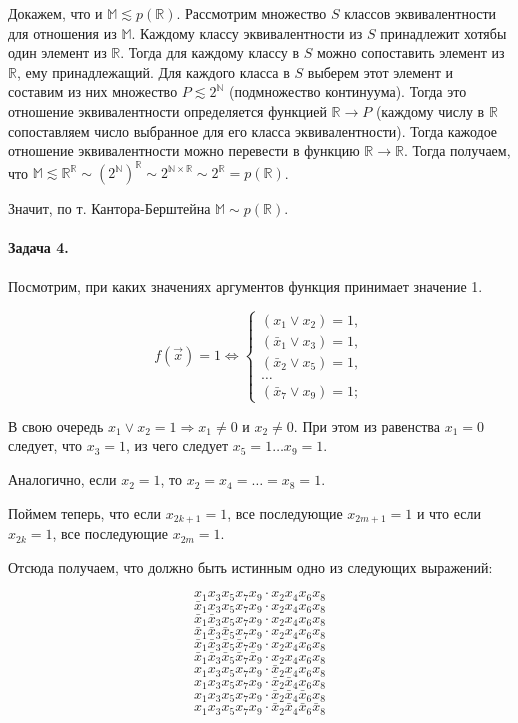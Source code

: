 \documentclass{article}
\newcommand{\andi}{$ и $}
\newcommand{\N}{\mathbb{N}}
\newcommand{\R}{\mathbb{R}}
\newcommand{\M}{\mathbb{M}}
\newcommand{\conti}{2^{\N}}
\begin{document}
     Докажем, что и $\M \apprle p(\R)$. Рассмотрим множество $S$ классов эквивалентности для отношения из $\M$. Каждому классу эквивалентности из $S$ принадлежит хотябы один элемент из $\R$. Тогда для каждому классу в $S$ можно сопоставить элемент из $\R$, ему принадлежащий. Для каждого класса в $S$ выберем этот элемент и составим из них множество $P \apprle \conti$ (подмножество континуума). Тогда это отношение эквивалентности определяется функцией $\R \rightarrow P$ (каждому числу в $\R$ сопоставляем число выбранное для его класса эквивалентности). Тогда кажодое отношение эквивалентности можно перевести в функцию $\R \rightarrow \R$. Тогда получаем, что $\M \apprle \R^{\R} \sim (\conti)^{\R} \sim 2^{\N \times \R} \sim 2^{\R} = p(\R)$.

     Значит, по т. Кантора-Берштейна $\M \sim p(\R)$.

     \paragraph{Задача 4.}
     Посмотрим, при каких значениях аргументов функция принимает значение 1.
    
     \begin{equation*}
       f(\vec{x}) = 1 \Leftrightarrow
         \begin{cases}
           (x_1 \vee x_2) = 1, \\
           (\bar{x}_1 \vee x_3) = 1, \\
           (\bar{x}_2 \vee x_5) = 1, \\
           \ldots \\
           (\bar{x}_7 \vee x_9) = 1;
         \end{cases}
    \end{equation*}

    В свою очередь $x_1 \vee x_2 = 1 \Rightarrow x_1 \ne 0 \andi x_2 \ne 0$. При этом из равенства $x_1 = 0$ следует, что $x_3 = 1$, из чего следует $x_5 = 1 \ldots x_9 = 1$.

    Аналогично, если $x_2 = 1$, то $x_2 = x_4 = \ldots = x_8 = 1$.   

    Поймем теперь, что если $x_{2k + 1} = 1$, все последующие $x_{2m + 1} = 1$ и что если
                                $x_{2k} = 1$, все последующие $x_{2m} = 1$.

    Отсюда получаем, что должно быть истинным одно из следующих выражений:

    $$ x_1x_3x_5 x_7 x_9 \cdot x_2x_4x_6x_8$$
    $$ \bar{x}_1x_3x_5 x_7 x_9 \cdot x_2x_4x_6x_8$$
    $$ \bar{x}_1\bar{x}_3x_5 x_7 x_9 \cdot x_2x_4x_6x_8$$
    $$ \bar{x}_1\bar{x}_3\bar{x}_5x_7x_9 \cdot x_2x_4x_6x_8$$
    $$ \bar{x}_1\bar{x}_3\bar{x}_5\bar{x}_7x_9 \cdot x_2x_4x_6x_8$$
    $$ \bar{x}_1\bar{x}_3\bar{x}_5\bar{x}_7\bar{x}_9 \cdot x_2x_4x_6x_8$$
    $$ x_1x_3x_5 x_7 x_9 \cdot \bar{x}_2x_4x_6x_8$$
    $$ x_1x_3x_5 x_7 x_9 \cdot \bar{x}_2\bar{x}_4x_6x_8$$
    $$ x_1x_3x_5 x_7 x_9 \cdot \bar{x}_2\bar{x}_4\bar{x}_6x_8$$
    $$ x_1x_3x_5 x_7 x_9 \cdot \bar{x}_2\bar{x}_4\bar{x}_6\bar{x}_8$$
    
\end{document}
